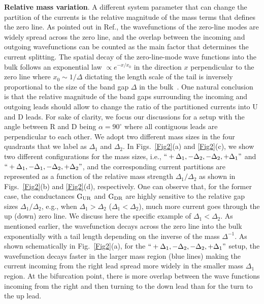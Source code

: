 \documentclass[journal=nalefd,manuscript=communication]{achemso}
\begin{document}
\textbf{Relative mass variation}.
A different system parameter that can change the partition of the currents is the relative magnitude of the mass terms that defines the zero line. 
As pointed out in Ref., the wavefunctions of the zero-line modes are widely spread across the zero line, and the overlap between the incoming and outgoing wavefunctions can be counted as the main factor that determines the current splitting. 
The spatial decay of the zero-line-mode wave functions into the bulk follows an exponential law $\propto e^{- x/x_0}$ in the direction $x$ perpendicular to the zero line where $x_0 \sim 1/\Delta$ dictating the length scale of the tail is inversely proportional to the size of the band gap $\Delta$ in the bulk~\cite{partition}. One natural conclusion is that the relative magnitude of the band gaps surrounding the incoming and outgoing leads should allow to change the ratio of the partitioned currents into U and D leads. For sake of clarity, we focus our discussions for a setup with the angle between R and D being $\alpha=90^\circ$ where all contiguous leads are perpendicular to each other.
We adopt two different mass sizes in the four quadrants that we label as $\Delta_1$ and $\Delta_2$. In Figs.~\ref{Fig2}(a) and  \ref{Fig2}(c), we show two different configurations for the mass sizes, i.e., $``+\Delta_1,-\Delta_2,-\Delta_2,+\Delta_1"$  and $``+\Delta_1, -\Delta_1, -\Delta_2, +\Delta_2"$, and the corresponding current partitions are represented as a function of the relative mass strength $\Delta_1/\Delta_2$ as shown in Figs.~\ref{Fig2}(b) and \ref{Fig2}(d), respectively. One can observe that, for the former case, the conductances $\rm G_{UR}$ and $\rm G_{DR}$ are highly sensitive to the relative gap sizes $\Delta_1/\Delta_2$, e.g., when $\Delta_1>\Delta_2$ ($\Delta_1<\Delta_2$), much more current goes through the up (down) zero line. We discuss here the specific example of $\Delta_1 < \Delta_2$. As mentioned earlier, the wavefunction decays across the zero line into the bulk exponentially with a tail length depending on the inverse of the mass $\Delta^{-1}$. As shown schematically in Fig.~\ref{Fig2}(a), for the $``+\Delta_1,-\Delta_2,-\Delta_2,+\Delta_1"$ setup, the wavefunction decays faster in the larger mass region (blue lines) making the current incoming from the right lead spread more widely in the smaller mass $\Delta_1$ region. At the bifurcation point, there is more overlap between the wave functions incoming from the right and then turning to the down lead than for the turn to the up lead.
\end{document}
